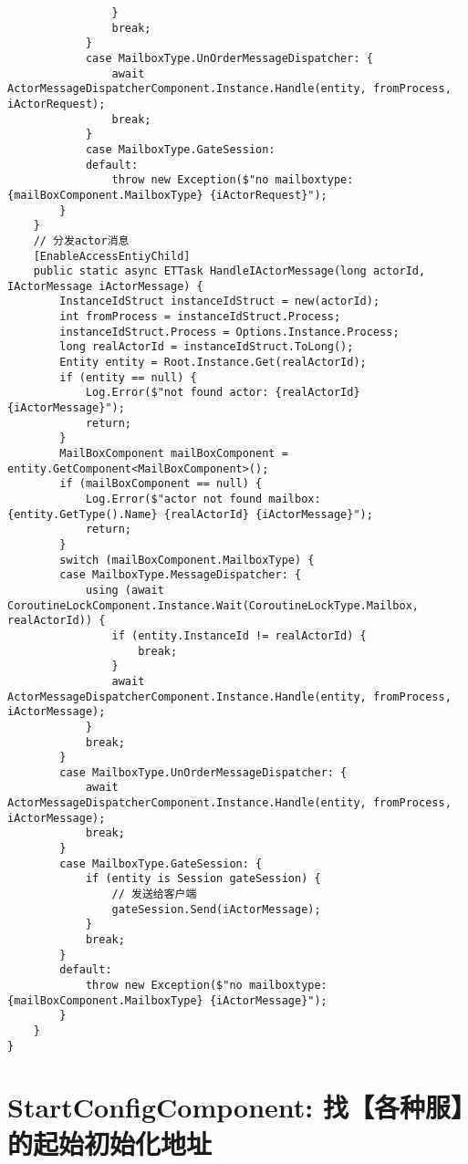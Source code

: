 \documentclass[9pt, b5paper]{article}
\begin{document}
\begin{verbatim}
                }
                break;
            }
            case MailboxType.UnOrderMessageDispatcher: {
                await ActorMessageDispatcherComponent.Instance.Handle(entity, fromProcess, iActorRequest);
                break;
            }
            case MailboxType.GateSession:
            default:
                throw new Exception($"no mailboxtype: {mailBoxComponent.MailboxType} {iActorRequest}");
        }
    }
    // 分发actor消息
    [EnableAccessEntiyChild]
    public static async ETTask HandleIActorMessage(long actorId, IActorMessage iActorMessage) {
        InstanceIdStruct instanceIdStruct = new(actorId);
        int fromProcess = instanceIdStruct.Process;
        instanceIdStruct.Process = Options.Instance.Process;
        long realActorId = instanceIdStruct.ToLong();
        Entity entity = Root.Instance.Get(realActorId);
        if (entity == null) {
            Log.Error($"not found actor: {realActorId} {iActorMessage}");
            return;
        }
        MailBoxComponent mailBoxComponent = entity.GetComponent<MailBoxComponent>();
        if (mailBoxComponent == null) {
            Log.Error($"actor not found mailbox: {entity.GetType().Name} {realActorId} {iActorMessage}");
            return;
        }
        switch (mailBoxComponent.MailboxType) {
        case MailboxType.MessageDispatcher: {
            using (await CoroutineLockComponent.Instance.Wait(CoroutineLockType.Mailbox, realActorId)) {
                if (entity.InstanceId != realActorId) {
                    break;
                }
                await ActorMessageDispatcherComponent.Instance.Handle(entity, fromProcess, iActorMessage);
            }
            break;
        }
        case MailboxType.UnOrderMessageDispatcher: {
            await ActorMessageDispatcherComponent.Instance.Handle(entity, fromProcess, iActorMessage);
            break;
        }
        case MailboxType.GateSession: {
            if (entity is Session gateSession) {
                // 发送给客户端
                gateSession.Send(iActorMessage);
            }
            break;
        }
        default:
            throw new Exception($"no mailboxtype: {mailBoxComponent.MailboxType} {iActorMessage}");
        }
    }
}
\end{verbatim}

\section{StartConfigComponent: 找【各种服】的起始初始化地址}
\label{sec-2}
\end{document}
